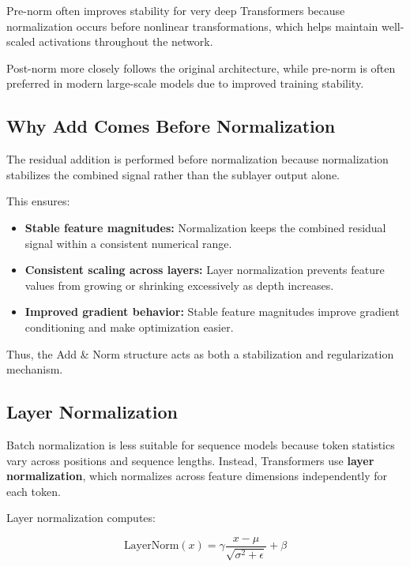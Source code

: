 \documentclass[11pt]{article}
\begin{document}
Pre-norm often improves stability for very deep Transformers because normalization occurs before nonlinear transformations, which helps maintain well-scaled activations throughout the network.

Post-norm more closely follows the original architecture, while pre-norm is often preferred in modern large-scale models due to improved training stability.

\subsection{Why Add Comes Before Normalization}

The residual addition is performed before normalization because normalization stabilizes the combined signal rather than the sublayer output alone.

This ensures:

\begin{itemize}

\item \textbf{Stable feature magnitudes:}  
Normalization keeps the combined residual signal within a consistent numerical range.

\item \textbf{Consistent scaling across layers:}  
Layer normalization prevents feature values from growing or shrinking excessively as depth increases.

\item \textbf{Improved gradient behavior:}  
Stable feature magnitudes improve gradient conditioning and make optimization easier.

\end{itemize}

Thus, the Add \& Norm structure acts as both a stabilization and regularization mechanism.

\subsection{Layer Normalization}

Batch normalization is less suitable for sequence models because token statistics vary across positions and sequence lengths. Instead, Transformers use \textbf{layer normalization}, which normalizes across feature dimensions independently for each token.

Layer normalization computes:

\[
\text{LayerNorm}(x)
=
\gamma
\frac{x - \mu}{\sqrt{\sigma^2 + \epsilon}}
+
\beta
\]
\end{document}
